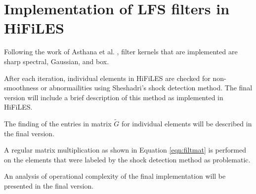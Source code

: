 \section{Implementation of LFS filters in HiFiLES}
\label{sec:implementation}
Following the work of Asthana et al. \cite{asthana2014}, filter kernels that are implemented are sharp spectral, Gaussian, and box.

After each iteration, individual elements in HiFiLES are checked for non-smoothness or abnormailities using Sheshadri's \cite{sheshadri2014shock} shock detection method. The final version will include a brief description of this method as implemented in HiFiLES.

The finding of the entries in matrix $\tilde{G}$ for individual elements will be described in the final version.

A regular matrix multiplication as shown in Equation \eqref{eqn:filtmat} is performed on the elements that were labeled by the shock detection method as problematic.

An analysis of operational complexity of the final implementation will be presented in the final version. 